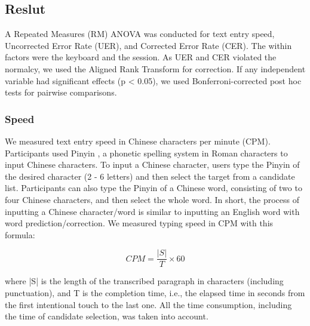 \subsection{Reslut}

A Repeated Measures (RM) ANOVA was conducted for text entry speed, Uncorrected Error Rate (UER), and Corrected Error Rate (CER). The within factors were the keyboard and the session. As UER and CER violated the normalcy, we used the Aligned Rank Transform \cite{2011-Aligned} for correction. If any independent variable had significant effects (p < 0.05), we used Bonferroni-corrected post hoc tests for pairwise comparisons.

\subsubsection{Speed}

We measured text entry speed in Chinese characters per minute (CPM). Participants used Pinyin \cite{Website-Pinyin}, a phonetic spelling system in Roman characters to input Chinese characters. To input a Chinese character, users type the Pinyin of the desired character (2 - 6 letters) and then select the target from a candidate list. Participants can also type the Pinyin of a Chinese word, consisting of two to four Chinese characters, and then select the whole word. In short, the process of inputting a Chinese character/word is similar to inputting an English word with word prediction/correction. We measured typing speed in CPM with this formula:

\begin{equation}
	CPM = \frac{|S|}{T} \times 60
\end{equation}

where |S| is the length of the transcribed paragraph in characters (including punctuation), and T is the completion time, i.e., the elapsed time in seconds from the first intentional touch to the last one. All the time consumption, including the time of candidate selection, was taken into account.


